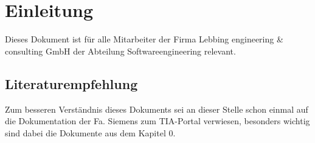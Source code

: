 \chapter{Einleitung}\label{chap:Einleitung}

Dieses Dokument ist für alle Mitarbeiter der Firma Lebbing engineering \& consulting GmbH der Abteilung Softwareengineering relevant.

\par
\section{Literaturempfehlung}

Zum besseren Verständnis dieses Dokuments sei an dieser Stelle schon einmal auf die Dokumentation der Fa. Siemens zum TIA-Portal verwiesen, besonders wichtig sind dabei die Dokumente aus dem Kapitel 0.
